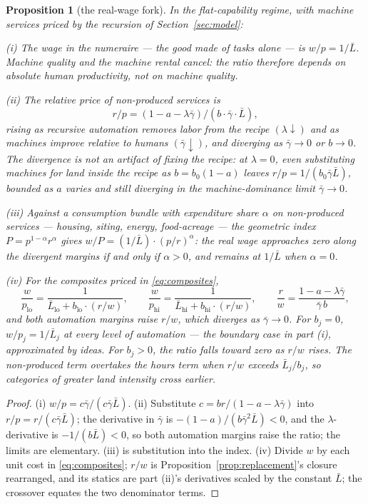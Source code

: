 \documentclass[12pt]{article}
\theoremstyle{plain}
\newtheorem{proposition}{Proposition}
\newcommand{\lo}{\mathrm{lo}}
\newcommand{\hi}{\mathrm{hi}}
\begin{document}
\begin{proposition}[the real-wage fork]\label{prop:fork}
In the flat-capability regime, with machine services priced by the recursion of Section~\ref{sec:model}:

(i) The wage in the numeraire --- the good made of tasks alone --- is $w/p = 1/\bar{L}$. Machine quality and the machine rental cancel: the ratio therefore depends on absolute human productivity, not on machine quality.

(ii) The relative price of non-produced services is
\begin{equation}\label{eq:fork-price}
r/p = (1 - a - \lambda \bar{\gamma}) / (b\cdot \bar{\gamma}\cdot \bar{L}),
\end{equation}
rising as recursive automation removes labor from the recipe $(\lambda\downarrow)$ and as machines improve relative to humans $(\bar{\gamma}\downarrow)$, and diverging as $\bar{\gamma}\to0$ or $b\to0$. The divergence is not an artifact of fixing the recipe: at $\lambda=0$, even substituting machines for land inside the recipe as $b=b_0(1-a)$ leaves $r/p=1/(b_0\bar{\gamma}\bar{L})$, bounded as $a$ varies and still diverging in the machine-dominance limit $\bar{\gamma}\to0$.

(iii) Against a consumption bundle with expenditure share $\alpha$ on non-produced services --- housing, siting, energy, food-acreage --- the geometric index $P = p^{1-\alpha}r^{\alpha}$ gives $w/P = (1/\bar{L})\cdot (p/r)^{\alpha}$: the real wage approaches zero along the divergent margins if and only if $\alpha > 0$, and remains at $1/\bar{L}$ when $\alpha = 0$.

(iv) For the composites priced in \eqref{eq:composites},
\begin{equation}\label{eq:fork-pair}
\frac{w}{p_{\lo}} = \frac{1}{\bar{L}_{\lo} + b_{\lo}\cdot (r/w)},
\qquad
\frac{w}{p_{\hi}} = \frac{1}{\bar{L}_{\hi} + b_{\hi}\cdot (r/w)},
\qquad
\frac{r}{w} = \frac{1-a-\lambda\bar{\gamma}}{\bar{\gamma}\, b},
\end{equation}
and both automation margins raise $r/w$, which diverges as $\bar{\gamma}\to0$. For $b_j=0$, $w/p_j=1/\bar{L}_j$ at every level of automation --- the boundary case in part (i), approximated by ideas. For $b_j>0$, the ratio falls toward zero as $r/w$ rises. The non-produced term overtakes the hours term when $r/w$ exceeds $\bar{L}_j/b_j$, so categories of greater land intensity cross earlier.
\end{proposition}

\begin{proof}
(i) $w/p = c\bar{\gamma}/(c\bar{\gamma}\bar{L})$. (ii) Substitute $c = br/(1-a-\lambda \bar{\gamma})$ into $r/p = r/(c\bar{\gamma}\bar{L})$; the derivative in $\bar{\gamma}$ is $-(1-a)/(b\bar{\gamma}^2\bar{L}) < 0$, and the $\lambda$-derivative is $-1/(b\bar{L}) < 0$, so both automation margins raise the ratio; the limits are elementary. (iii) is substitution into the index. (iv) Divide $w$ by each unit cost in \eqref{eq:composites}; $r/w$ is Proposition~\ref{prop:replacement}'s closure rearranged, and its statics are part (ii)'s derivatives scaled by the constant $\bar{L}$; the crossover equates the two denominator terms.
\end{proof}
\end{document}
